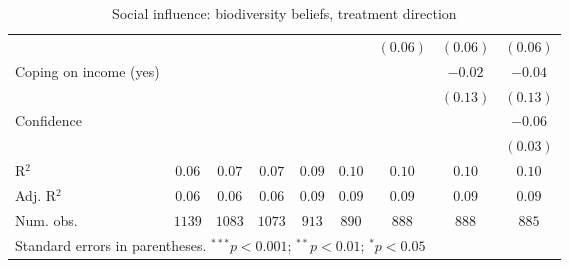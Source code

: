 \begin{table}[h]
\begin{center}
\begin{tabular}{l c c c c c c c c}
                                                                                &               &               &               &               &               & $(0.06)$      & $(0.06)$      & $(0.06)$      \\
Coping on income (yes)                                                          &               &               &               &               &               &               & $-0.02$       & $-0.04$       \\
                                                                                &               &               &               &               &               &               & $(0.13)$      & $(0.13)$      \\
Confidence                                                                      &               &               &               &               &               &               &               & $-0.06$       \\
                                                                                &               &               &               &               &               &               &               & $(0.03)$      \\
\hline
R$^2$                                                                           & $0.06$        & $0.07$        & $0.07$        & $0.09$        & $0.10$        & $0.10$        & $0.10$        & $0.10$        \\
Adj. R$^2$                                                                      & $0.06$        & $0.06$        & $0.06$        & $0.09$        & $0.09$        & $0.09$        & $0.09$        & $0.09$        \\
Num. obs.                                                                       & $1139$        & $1083$        & $1073$        & $913$         & $890$         & $888$         & $888$         & $885$         \\
\hline
\multicolumn{9}{l}{\scriptsize{Standard errors in parentheses. $^{***}p<0.001$; $^{**}p<0.01$; $^{*}p<0.05$}}
\end{tabular}
\caption{Social influence: biodiversity beliefs, treatment direction}
\label{table:social_influence_bioemi_treatment_direction}
\end{center}
\end{table}
